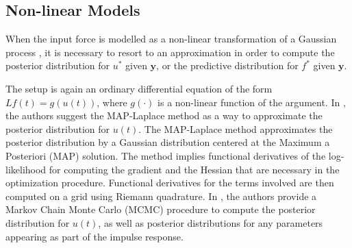 \documentclass[journal]{IEEEtran}
\newcommand{\simo}[1]{{\color{red}#1}}
\begin{document}
%
%
%

%
%
\subsection{Non-linear Models}

When the input force is modelled as a non-linear transformation of a Gaussian process \cite{Lawrence:gpsim2007a,
Gao:latent08, Titsias:BMC:2012}, it is necessary to resort to an approximation in order to compute the posterior
distribution for $u^*$ given $\mathbf{y}$, or the predictive distribution for $f^*$ given $\mathbf{y}$.

The setup is again an ordinary differential equation of the form $Lf(t)=g(u(t))$, where $g(\cdot)$ is a non-linear function
of the argument. In \cite{Lawrence:gpsim2007a, Gao:latent08}, the authors suggest the MAP-Laplace method
\cite{Bishop:PRML06} as a way to approximate the posterior distribution for $u(t)$. The MAP-Laplace method approximates
the posterior distribution by a
Gaussian distribution centered at the Maximum a Posteriori (MAP) solution. The method implies functional derivatives of the
log-likelihood for computing the gradient and the Hessian that are necessary in the optimization procedure. Functional
derivatives for the terms involved are then computed on a grid using Riemann quadrature. In \cite{Titsias:BMC:2012}, the
authors provide a Markov Chain Monte Carlo (MCMC) procedure to compute the posterior distribution for $u(t)$, as well
as posterior distributions for any parameters appearing as part of the impulse response.
\end{document}
